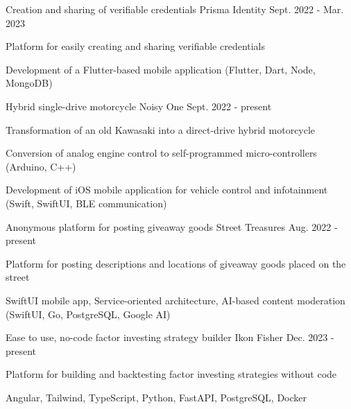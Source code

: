


\begin{cventries}

\cventry
{Creation and sharing of verifiable credentials} %
{Prisma Identity} %
{} %
{Sept. 2022 - Mar. 2023} %
{ %
\begin{cvitems}
\item {Platform for easily creating and sharing verifiable credentials}
\item {Development of a Flutter-based mobile application (Flutter, Dart, Node, MongoDB)}
\end{cvitems}
}
\cventry
{Hybrid single-drive motorcycle} %
{Noisy One} %
{} %
{Sept. 2022 - present} %
{ %
\begin{cvitems}
\item {Transformation of an old Kawasaki into a direct-drive hybrid motorcycle}
\item {Conversion of analog engine control to self-programmed micro-controllers (Arduino, C++)}
\item {Development of iOS mobile application for vehicle control and infotainment (Swift, SwiftUI, BLE communication)}
\end{cvitems}
}
\cventry
{Anonymous platform for posting giveaway goods} %
{Street Treasures} %
{} %
{Aug. 2022 - present} %
{ %
\begin{cvitems}
\item {Platform for posting descriptions and locations of giveaway goods placed on the street}
\item {SwiftUI mobile app, Service-oriented architecture, AI-based content moderation (SwiftUI, Go, PostgreSQL, Google AI)}
\end{cvitems}
}
\cventry
{Ease to use, no-code factor investing strategy builder} %
{Ikon Fisher} %
{} %
{Dec. 2023 - present} %
{ %
\begin{cvitems}
\item {Platform for building and backtesting factor investing strategies without code}
\item {Angular, Tailwind, TypeScript, Python, FastAPI, PostgreSQL, Docker}
\end{cvitems}
}



\end{cventries}